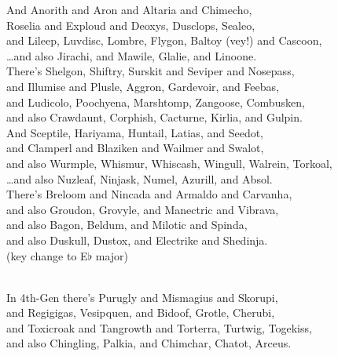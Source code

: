 \documentclass{amsart}
\begin{document}
And Anorith and Aron and Altaria and Chimecho,\\
Roselia and Exploud and Deoxys, Dusclops, Sealeo,\\
and Lileep, Luvdisc, Lombre, Flygon, Baltoy (vey!) and Cascoon,\\
\dots and also Jirachi, and Mawile, Glalie, and Linoone.\\

There's Shelgon, Shiftry, Surskit and Seviper and Nosepass,\\
and Illumise and Plusle, Aggron, Gardevoir, and Feebas,\\
and Ludicolo, Poochyena, Marshtomp, Zangoose, Combusken,\\
and also Crawdaunt, Corphish, Cacturne, Kirlia, and Gulpin.\\

And Sceptile, Hariyama, Huntail, Latias, and Seedot,\\
and Clamperl and Blaziken and Wailmer and Swalot,\\
and also Wurmple, Whismur, Whiscash, Wingull, Walrein, Torkoal,\\
\dots and also Nuzleaf, Ninjask, Numel, Azurill, and Absol.\\

There's Breloom and Nincada and Armaldo and Carvanha,\\
and also Groudon, Grovyle, and Manectric and Vibrava,\\
and also Bagon, Beldum, and Milotic and Spinda,\\
and also Duskull, Dustox, and Electrike and Shedinja.\\



(key change to E$\flat$ major)\\\

In 4th-Gen there's Purugly and Mismagius and Skorupi,\\
and Regigigas, Vesipquen, and Bidoof, Grotle, Cherubi,\\
and Toxicroak and Tangrowth and Torterra, Turtwig, Togekiss,\\
and also Chingling, Palkia, and Chimchar, Chatot, Arceus.\\
\end{document}
